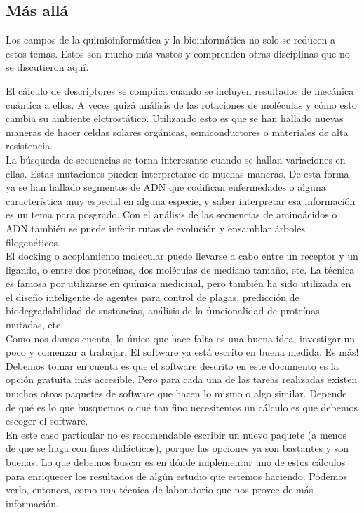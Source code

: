 \documentclass[10pt,letterpaper]{article}
\begin{document}
\subsection{M\'as all\'a}
Los campos de la quimioinform\'atica y la bioinform\'atica no solo se reducen a estos temas. Estos son mucho m\'as vastos y comprenden otras disciplinas que no se discutieron aqu\'i.

El c\'alculo de descriptores se complica cuando se incluyen resultados de mec\'anica cu\'antica a ellos. A veces quiz\'a an\'alisis de las rotaciones de mol\'eculas y c\'omo esto cambia su ambiente elctrost\'atico. Utilizando esto es que se han hallado nuevas maneras de hacer celdas solares org\'anicas, semiconductores o materiales de alta resistencia.\\

La b\'usqueda de secuencias se torna interesante cuando se hallan variaciones en ellas. Estas mutaciones pueden interpretarse de muchas maneras. De esta forma ya se han hallado segmentos de ADN que codifican enfermedades o alguna caracter\'istica muy especial en alguna especie, y saber interpretar esa informaci\'on es un tema para posgrado. Con el an\'alisis de las secuencias de amino\'acidos o ADN tambi\'en se puede inferir rutas de evoluci\'on y ensamblar \'arboles filogen\'eticos.\\

El docking o acoplamiento molecular puede llevarse a cabo entre un receptor y un ligando, o entre dos prote\'inas, dos mol\'eculas de mediano tama\~no, etc. La t\'ecnica es famosa por utilizarse en qu\'imica medicinal, pero tambi\'en ha sido utilizada en el dise\~no inteligente de agentes para control de plagas, predicci\'on de biodegradabilidad de sustancias, an\'alisis de la funcionalidad de prote\'inas mutadas, etc.\\

Como nos damos cuenta, lo \'unico que hace falta es una buena idea, investigar un poco y comenzar a trabajar. El software ya est\'a escrito en buena medida. Es m\'as! Debemos tomar en cuenta es que el software descrito en este documento es la opci\'on gratuita m\'as accesible. Pero para cada una de las tareas realizadas existen muchos otros paquetes de software que hacen lo mismo o algo similar. Depende de qu\'e es lo que busquemos o qu\'e tan fino necesitemos un c\'alculo es que debemos escoger el software.\\

En este caso particular no es recomendable escribir un nuevo paquete (a menos de que se haga con fines did\'acticos), porque las opciones ya son bastantes y son buenas. Lo que debemos buscar es en d\'onde implementar uno de estos c\'alculos para enriquecer los resultados de alg\'un estudio que estemos haciendo. Podemos verlo, entonces, como una t\'ecnica de laboratorio que nos provee de m\'as informaci\'on.
\end{document}
